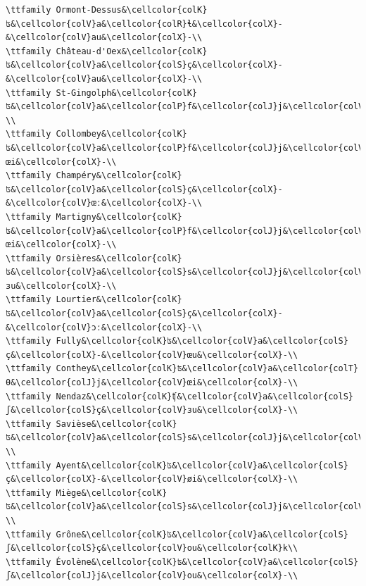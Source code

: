 \begin{verbatim}
\ttfamily Ormont-Dessus&\cellcolor{colK}ʦ&\cellcolor{colV}a&\cellcolor{colR}ɬ&\cellcolor{colX}-&\cellcolor{colV}au&\cellcolor{colX}-\\
\ttfamily Château-d'Oex&\cellcolor{colK}ʦ&\cellcolor{colV}a&\cellcolor{colS}ç&\cellcolor{colX}-&\cellcolor{colV}au&\cellcolor{colX}-\\
\ttfamily St-Gingolph&\cellcolor{colK}ʦ&\cellcolor{colV}a&\cellcolor{colP}f&\cellcolor{colJ}j&\cellcolor{colV}au&\cellcolor{colX}-\\
\ttfamily Collombey&\cellcolor{colK}ʦ&\cellcolor{colV}a&\cellcolor{colP}f&\cellcolor{colJ}j&\cellcolor{colV}œi&\cellcolor{colX}-\\
\ttfamily Champéry&\cellcolor{colK}ʦ&\cellcolor{colV}a&\cellcolor{colS}ç&\cellcolor{colX}-&\cellcolor{colV}œː&\cellcolor{colX}-\\
\ttfamily Martigny&\cellcolor{colK}ʦ&\cellcolor{colV}a&\cellcolor{colP}f&\cellcolor{colJ}j&\cellcolor{colV}œi&\cellcolor{colX}-\\
\ttfamily Orsières&\cellcolor{colK}ʦ&\cellcolor{colV}a&\cellcolor{colS}s&\cellcolor{colJ}j&\cellcolor{colV}ɜu&\cellcolor{colX}-\\
\ttfamily Lourtier&\cellcolor{colK}ʦ&\cellcolor{colV}a&\cellcolor{colS}ç&\cellcolor{colX}-&\cellcolor{colV}ɔː&\cellcolor{colX}-\\
\ttfamily Fully&\cellcolor{colK}ʦ&\cellcolor{colV}a&\cellcolor{colS}ç&\cellcolor{colX}-&\cellcolor{colV}œu&\cellcolor{colX}-\\
\ttfamily Conthey&\cellcolor{colK}ʦ&\cellcolor{colV}a&\cellcolor{colT}θ&\cellcolor{colJ}j&\cellcolor{colV}œi&\cellcolor{colX}-\\
\ttfamily Nendaz&\cellcolor{colK}ʧ&\cellcolor{colV}a&\cellcolor{colS}ʃ&\cellcolor{colS}ç&\cellcolor{colV}ɜu&\cellcolor{colX}-\\
\ttfamily Savièse&\cellcolor{colK}ʦ&\cellcolor{colV}a&\cellcolor{colS}s&\cellcolor{colJ}j&\cellcolor{colV}u&\cellcolor{colX}-\\
\ttfamily Ayent&\cellcolor{colK}ʦ&\cellcolor{colV}a&\cellcolor{colS}ç&\cellcolor{colX}-&\cellcolor{colV}øi&\cellcolor{colX}-\\
\ttfamily Miège&\cellcolor{colK}ʦ&\cellcolor{colV}a&\cellcolor{colS}s&\cellcolor{colJ}j&\cellcolor{colV}ou&\cellcolor{colX}-\\
\ttfamily Grône&\cellcolor{colK}ʦ&\cellcolor{colV}a&\cellcolor{colS}ʃ&\cellcolor{colS}ç&\cellcolor{colV}ou&\cellcolor{colK}k\\
\ttfamily Évolène&\cellcolor{colK}ʦ&\cellcolor{colV}a&\cellcolor{colS}ʃ&\cellcolor{colJ}j&\cellcolor{colV}ou&\cellcolor{colX}-\\

\end{verbatim}
